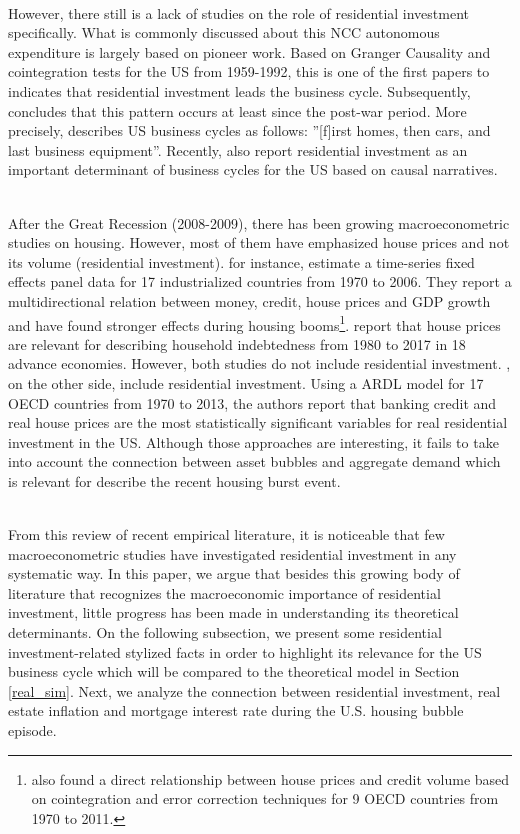 \documentclass[11pt]{article}
\begin{document}
\\
However, there still is a lack of studies on the role of residential investment specifically.
What is commonly  discussed about this NCC autonomous expenditure is largely based on \textcite{green_follow_1997} pioneer work.
Based on Granger Causality and cointegration tests for the US from 1959-1992, this is one of the first papers to indicates that residential investment leads the business cycle.
Subsequently, \textcite{leamer_housing_2007} concludes that this pattern occurs at least since the post-war period.
More precisely,  \textcite[p.~8]{leamer_housing_2007} describes US business cycles as follows: ''[f]irst homes, then cars,
and last business equipment''.
Recently, \textcites{fiebiger_semi-autonomous_2018}{fiebiger_trend_2017} also report residential investment as an important determinant of business cycles for the US based on causal narratives.

\\
After the Great Recession (2008-2009), there has been growing macroeconometric studies on housing.
However, most of them have emphasized house prices and not its volume (residential investment).
\textcite{goodhart_house_2008} for instance, estimate a time-series fixed effects panel data for 17 industrialized countries from 1970 to 2006. They report a multidirectional relation between money, credit, house prices and GDP growth and have found stronger effects during housing booms\footnote{\textcite{Arestis_Bank_2014} also found a  direct relationship between house prices and credit volume based on cointegration and error correction techniques for 9 OECD countries from 1970 to 2011.}. 
\textcite{wood_house_2020} report that house prices are relevant for describing household indebtedness from 1980 to 2017 in 18 advance economies.
However, both studies do not include residential investment.
\textcite{arestis_residential_2015}, on the other side, include residential investment. Using a ARDL model for 17 OECD countries from 1970 to 2013, the authors report that banking credit and real house prices are the most statistically significant variables for real residential investment in the US.
Although those approaches are interesting, it fails to take into account the connection between asset bubbles and aggregate demand which is relevant for describe the recent housing burst event.

\\
From this review of recent empirical literature, it is noticeable that few macroeconometric studies have investigated residential investment in any systematic way.
In this paper, we argue that besides this growing body of literature that recognizes the macroeconomic importance of residential investment, little progress has been made in understanding its theoretical determinants.
On the following subsection, we present some residential investment-related stylized facts in order to highlight its relevance for the US business cycle which will be compared to the theoretical model in Section \ref{real_sim}.
Next, we analyze the connection between residential investment, real estate inflation and mortgage interest rate during the U.S. housing bubble episode.
\end{document}
